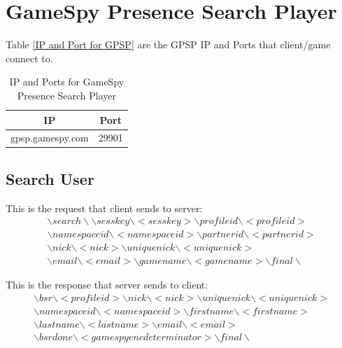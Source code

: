 \documentclass[oneside,titlepage,a4paper]{Definition/retrospy} %
\begin{document}
\section{GameSpy Presence Search Player}
Table \ref{IP and Port for GPSP} are the GPSP IP and Ports that client/game connect to.
\begin{table}[H]
	\centering
	\begin{tabular}{|c|c|}
		\hline 
		\textbf{IP}&\textbf{Port}  \\ 		
		\hline 
		gpsp.gamespy.com&29901 \\
		\hline 
	\end{tabular} 
	\caption{IP and Ports for GameSpy Presence Search Player}
	\label{IP and Ports for GameSpy Presence Search Player}
	\end{table}
\subsection{Search User}
This is the request that client sends to server:
\begin{equation}\label{Search User Request}
\begin{split}
 \backslash search\backslash\backslash sesskey \backslash<sesskey>\backslash profileid \backslash <profileid> \\ \backslash namespaceid\backslash <namespaceid>  \backslash partnerid\backslash <partnerid>\\ \backslash nick \backslash <nick> \backslash uniquenick \backslash <uniquenick> \\ \backslash email \backslash <email> \backslash gamename \backslash <gamename> \backslash final \backslash
\end{split}
\end{equation}

This is the response that server sends to client:
\begin{equation}
	\begin{split}
	\backslash bsr \backslash <profileid> \backslash nick \backslash <nick>	\backslash uniquenick \backslash <uniquenick> \\
	\backslash namespaceid \backslash <namespaceid>\backslash firstname \backslash <firstname> \\ 
	\backslash lastname \backslash <lastname>\backslash email \backslash <email> \\
	\backslash bsrdone \backslash <gamespy enc determinator> \backslash final \backslash
	\end{split}
\end{equation}
\end{document}
